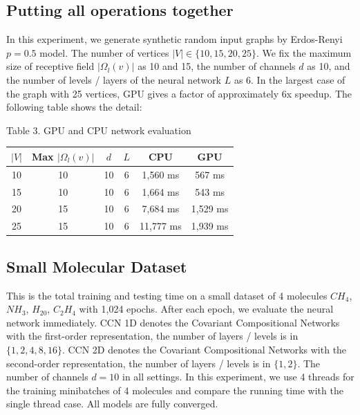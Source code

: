 \documentclass[a4paper]{article}
\begin{document}
\subsection{Putting all operations together}

In this experiment, we generate synthetic random input graphs by Erdos-Renyi $p = 0.5$ model. The number of vertices $|V| \in \{10, 15, 20, 25\}$. We fix the maximum size of receptive field $|\Omega_l(v)|$ as 10 and 15, the number of channels $d$ as 10, and the number of levels / layers of the neural network $L$ as 6. In the largest case of the graph with 25 vertices, GPU gives a factor of approximately 6x speedup. The following table shows the detail: 

\begin{center}
Table 3. GPU and CPU network evaluation
\begin{tabular}{|| c | c | c | c | c | c ||}
	\hline
	$|V|$ & Max $|\Omega_l(v)|$ & $d$ & $L$ & CPU & GPU \\
	\hline\hline
	10 & 10 & 10 & 6 & 1,560 ms & 567 ms \\
	\hline
	15 & 10 & 10 & 6 & 1,664 ms & 543 ms \\
	\hline 
	20 & 15 & 10 & 6 & 7,684 ms & 1,529 ms \\
	\hline
	25 & 15 & 10 & 6 & 11,777 ms & 1,939 ms \\
	\hline
\end{tabular}
\end{center}

\subsection{Small Molecular Dataset}

This is the total training and testing time on a small dataset of 4 molecules $CH_4$, $NH_3$, $H_20$, $C_2H_4$ with 1,024 epochs. After each epoch, we evaluate the neural network immediately. CCN 1D denotes the Covariant Compositional Networks with the first-order representation, the number of layers / levels is in $\{1, 2, 4, 8, 16\}$. CCN 2D denotes the Covariant Compositional Networks with the second-order representation, the number of layers / levels is in $\{1, 2\}$. The number of channels $d = 10$ in all settings. In this experiment, we use 4 threads for the training minibatches of 4 molecules and compare the running time with the single thread case. All models are fully converged.
\end{document}
